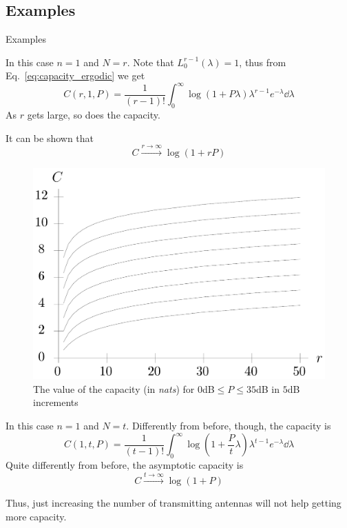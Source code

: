\subsection{Examples}
\begin{frame}[allowframebreaks]{Examples}

\begin{example}[$t=1$]
	In this case $n=1$ and $N=r$. Note that $L_0^{r-1}(\lambda)=1$, thus from Eq.~\eqref{eq:capacity_ergodic} we get
	$$C(r,1,P) = \frac{1}{(r-1)!}
	\int_0^\infty \log(1+P\lambda)
	\lambda^{r-1} e^{-\lambda}
	\dd{\lambda}$$
	As $r$ gets large, so does the capacity.
	
	It can be shown that
	$$C \xrightarrow{r\rightarrow\infty} \log(1+rP)$$
\end{example}

\begin{example}[$t=1$]
\begin{figure}
	\centering
	\includegraphics[width=0.6\linewidth]{img/capacity_t1}
	\caption{The value of the capacity (in \textit{nats}) for $0$dB$\leq P\leq 35$dB in $5$dB increments}
	\label{fig:capacity_t1}
\end{figure}
\end{example}

\begin{example}[$r=1$]
	In this case $n=1$ and $N=t$. Differently from before, though, the capacity is
	$$C(1,t,P) = \frac{1}{(t-1)!}
	\int_0^\infty \log(1+\frac{P}{t}\lambda)
	\lambda^{t-1} e^{-\lambda}
	\dd{\lambda}$$
	Quite differently from before, the asymptotic capacity is 
	$$C \xrightarrow{t\rightarrow\infty} \log(1+P)$$
\end{example}
Thus, just increasing the number of transmitting antennas will not help getting more capacity.


\end{frame}
